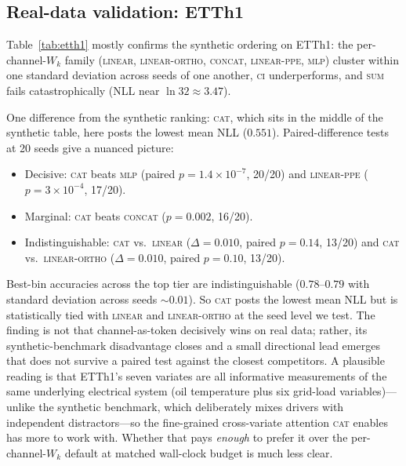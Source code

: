 \documentclass[11pt]{article}
\begin{document}
\subsection{Real-data validation: ETTh1}
\label{sec:results-etth1}



Table~\ref{tab:etth1} mostly confirms the synthetic ordering on
ETTh1: the per-channel-$W_k$ family (\textsc{linear},
\textsc{linear-ortho}, \textsc{concat}, \textsc{linear-ppe},
\textsc{mlp}) cluster within one standard deviation across seeds of
one another, \textsc{ci} underperforms, and \textsc{sum} fails
catastrophically (NLL near $\ln 32 \approx 3.47$).

One difference from the synthetic ranking: \textsc{cat}, which sits
in the middle of the synthetic table, here posts the lowest mean NLL
($0.551$). Paired-difference tests at 20 seeds give a nuanced
picture:

\begin{itemize}
\item Decisive: \textsc{cat} beats \textsc{mlp}
  (paired $p{=}1.4{\times}10^{-7}$, 20/20) and \textsc{linear-ppe}
  ($p{=}3{\times}10^{-4}$, 17/20).
\item Marginal: \textsc{cat} beats \textsc{concat}
  ($p{=}0.002$, 16/20).
\item Indistinguishable: \textsc{cat} vs.\ \textsc{linear}
  ($\Delta = 0.010$, paired $p{=}0.14$, 13/20) and
  \textsc{cat} vs.\ \textsc{linear-ortho}
  ($\Delta = 0.010$, paired $p{=}0.10$, 13/20).
\end{itemize}

Best-bin accuracies across the top tier are indistinguishable
($0.78$--$0.79$ with standard deviation across seeds ${\sim}0.01$).
So \textsc{cat} posts
the lowest mean NLL but is statistically tied with \textsc{linear}
and \textsc{linear-ortho} at the seed level we test. The finding
is not that channel-as-token decisively wins on real data; rather,
its synthetic-benchmark disadvantage closes and a small
directional lead emerges that does not survive a paired test
against the closest competitors. A plausible reading is that ETTh1's seven variates are all
informative measurements of the same underlying electrical system
(oil temperature plus six grid-load variables)---unlike the
synthetic benchmark, which deliberately mixes drivers with
independent distractors---so the fine-grained cross-variate
attention \textsc{cat} enables has more to work with. Whether that pays \emph{enough} to prefer it over the
per-channel-$W_k$ default at matched wall-clock budget is much
less clear.
\end{document}

